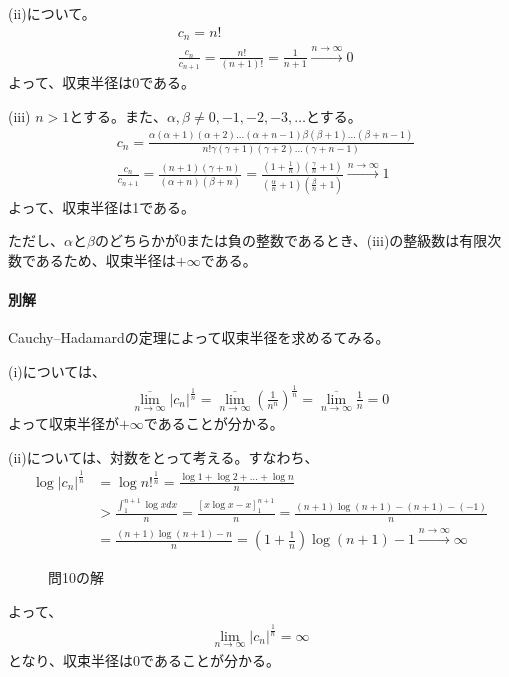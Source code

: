 (ii)について。
\begin{align*}
    &c_n=n!\\
    &\frac{c_n}{c_{n+1}}=\frac{n!}{(n+1)!}=\frac{1}{n+1}\overset{n\longrightarrow\infty}{\longrightarrow}0
\end{align*}
よって、収束半径は0である。

(iii)
$n>1$とする。また、$\alpha, \beta\neq 0, -1,-2,-3,\dots$とする。
\begin{align*}
    &c_n=\frac{\alpha(\alpha+1)(\alpha+2)\dots(\alpha+n-1)\beta(\beta+1)\dots(\beta+n-1)}{n!\gamma(\gamma+1)(\gamma+2)\dots(\gamma+n-1)}\\
    &\frac{c_n}{c_{n+1}}=\frac{(n+1)(\gamma+n)}{(\alpha+n)(\beta+n)}=\frac{(1+\frac{1}{n})(\frac{\gamma}{n}+1)}{(\frac{\alpha}{n}+1)(\frac{\beta}{n}+1)}\overset{n\longrightarrow\infty}{\longrightarrow}1
\end{align*}
よって、収束半径は1である。

ただし、$\alpha$と$\beta$のどちらかが0または負の整数であるとき、(iii)の整級数は有限次数であるため、収束半径は$+\infty$である。

\paragraph{別解}
Cauchy--Hadamardの定理によって収束半径を求めるてみる。

(i)については、
\begin{align*}
    \overline{\lim_{n\to\infty}}|c_n|^\frac{1}{n}=\overline{\lim_{n\to\infty}}\left(\frac{1}{n^n}\right)^\frac{1}{n}=\overline{\lim_{n\to\infty}}\frac{1}{n}=0
\end{align*}
よって収束半径が$+\infty$であることが分かる。

(ii)については、対数をとって考える。すなわち、
\begin{align*}
    \log |c_n|^\frac{1}{n}
   &=\log n!^\frac{1}{n}
   =\frac{\log 1 +\log 2 +\dots+\log n}{n}\\
   &>\frac{\int_{1}^{n+1}\log x dx}{n}
   =\frac{\left[x\log x -x\right]_1^{n+1}}{n}
   =\frac{(n+1)\log(n+1)-(n+1)-(-1)}{n}\\
   &=\frac{(n+1)\log(n+1)-n}{n}
   =\left(1+\frac{1}{n}\right)\log(n+1)-1
   \overset{n\longrightarrow\infty}{\longrightarrow}\infty
\end{align*}
\begin{figure}
    \centering
    \scalebox{0.6}{}
    \caption{問10の解}
\end{figure}
よって、
\begin{align*}
    \lim_{n\to\infty}|c_n|^\frac{1}{n}=\infty
\end{align*}
となり、収束半径は0であることが分かる。

